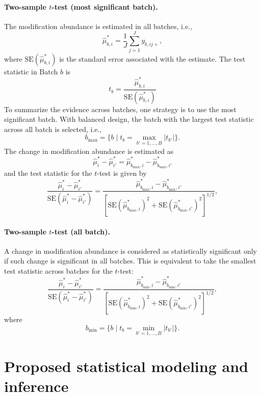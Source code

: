 \documentclass{mcp}
\begin{document}
\paragraph{Two-sample $t$-test (most significant batch).} 
The modification abundance is estimated in all batches, i.e., 
\[
\hat{\mu}_{b, i}^{\ast} = \frac{1}{J} \sum_{j=1}^{J} y_{b, ij+},
\]
where $\mathrm{SE} (\hat{\mu}_{b, i}^{\ast})$ is the standard error associated with the estimate. 
The test statistic in Batch $b$ is 
\[
t_{b} = \frac{\hat{\mu}_{b, i}^{\ast}}{\mathrm{SE} (\hat{\mu}_{b, i}^{\ast})}
\]
To summarize the evidence across batches, one strategy is to use the most significant batch. With balanced design, the batch with the largest test statistic across all batch is selected, i.e., 
\[
b_{\text{max}} = \{ b \mid t_b = \max_{b'=1, \ldots, B} | t_{b'} | \}.
\] 
The change in modification abundance is estimated as
\[
\hat{\mu}_{i}^{\ast} - \hat{\mu}_{i'}^{\ast} = \hat{\mu}_{b_{\text{max}}, i}^{\ast} - \hat{\mu}_{b_{\text{max}}, i'}^{\ast}
\]
and the test statistic for the $t$-test is given by
\[
\frac{\hat{\mu}_{i}^{\ast} - \hat{\mu}_{i'}^{\ast}}{\mathrm{SE}\left( \hat{\mu}_{i}^{\ast} - \hat{\mu}_{i'}^{\ast} \right)} 
= \frac{ \hat{\mu}_{b_{\text{max}}, i}^{\ast} - \hat{\mu}_{b_{\text{max}}, i'}^{\ast} }{\left[ \mathrm{SE}(\hat{\mu}_{b_{\text{max}}, i}^{\ast})^2 + \mathrm{SE}(\hat{\mu}_{b_{\text{max}}, i'}^{\ast})^2 \right]^{1/2}},
\]


\paragraph{Two-sample $t$-test (all batch).}
A change in modification abundance is considered as statistically significant only if such change is significant in all batches. This is equivalent to take the smallest test statistic across batches for the $t$-test: 
\[
\frac{\hat{\mu}_{i}^{\ast} - \hat{\mu}_{i'}^{\ast}}{\mathrm{SE}\left( \hat{\mu}_{i}^{\ast} - \hat{\mu}_{i'}^{\ast} \right)} 
= \frac{ \hat{\mu}_{b_{\text{min}}, i}^{\ast} - \hat{\mu}_{b_{\text{min}}, i'}^{\ast} }{\left[ \mathrm{SE}(\hat{\mu}_{b_{\text{min}}, i}^{\ast})^2 + \mathrm{SE}(\hat{\mu}_{b_{\text{min}}, i'}^{\ast})^2 \right]^{1/2}},
\]
where 
\[
b_{\text{min}} = \{ b \mid t_b = \min_{b'=1, \ldots, B} | t_{b'} | \}.
\] 



\section{Proposed statistical modeling and inference}
\end{document}
